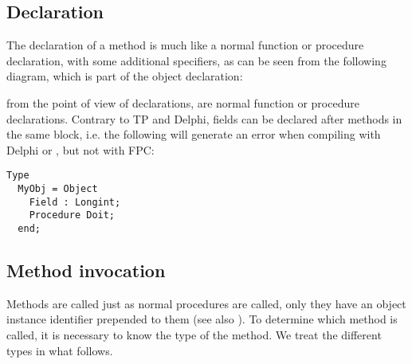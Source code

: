 \subsection{Declaration}
The declaration of a method is much like a normal function or procedure
declaration, with some additional specifiers, as can be seen from the
following diagram, which is part of the object declaration:

from the point of view of declarations,  are 
normal function or procedure declarations.
Contrary to TP and Delphi, fields can be declared after methods in the same 
block, i.e. the following will generate an error when compiling with Delphi
or \tp, but not with FPC:
\begin{verbatim}
Type 
  MyObj = Object
    Field : Longint;
    Procedure Doit;
  end;
\end{verbatim}


\subsection{Method invocation}
Methods are called just as normal procedures are called, only they have an
object instance identifier prepended to them (see also ).
To determine which method is called, it is necessary to know the type of
the method. We treat the different types in what follows.

